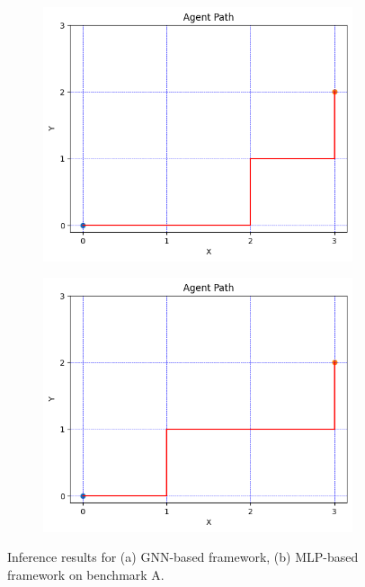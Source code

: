 \documentclass[letterpaper]{article}
\begin{document}
\begin{figure}[h!]
    \centering
    \begin{subfigure}[b]{0.45\textwidth}
        \includegraphics[width=\textwidth]{figure/gnn_inference.png}
        \caption{}
    \end{subfigure}
    \begin{subfigure}[b]{0.45\textwidth}
        \includegraphics[width=\textwidth]{figure/mlp_inference.png}
        \caption{}
    \end{subfigure}
    \caption{Inference results for (a) GNN-based framework, (b) MLP-based framework on benchmark A.}
    \label{fig:inference}
\end{figure}
\end{document}
